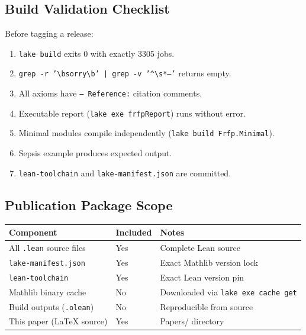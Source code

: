 \subsection{Build Validation Checklist}

Before tagging a release:

\begin{enumerate}
  \item[$\square$] \texttt{lake build} exits 0 with exactly 3305 jobs.
  \item[$\square$] \texttt{grep -r '\textbackslash bsorry\textbackslash b' | grep -v '\^{}\textbackslash s*--'} returns empty.
  \item[$\square$] All axioms have \texttt{-- Reference:} citation comments.
  \item[$\square$] Executable report (\texttt{lake exe frfpReport}) runs without error.
  \item[$\square$] Minimal modules compile independently (\texttt{lake build Frfp.Minimal}).
  \item[$\square$] Sepsis example produces expected output.
  \item[$\square$] \texttt{lean-toolchain} and \texttt{lake-manifest.json} are committed.
\end{enumerate}

\subsection{Publication Package Scope}

\begin{center}
\begin{tabular}{lll}
\toprule
Component & Included & Notes \\
\midrule
All \texttt{.lean} source files & Yes & Complete Lean source \\
\texttt{lake-manifest.json} & Yes & Exact Mathlib version lock \\
\texttt{lean-toolchain} & Yes & Exact Lean version pin \\
Mathlib binary cache & No & Downloaded via \texttt{lake exe cache get} \\
Build outputs (\texttt{.olean}) & No & Reproducible from source \\
This paper (LaTeX source) & Yes & Papers/ directory \\
\bottomrule
\end{tabular}
\end{center}

